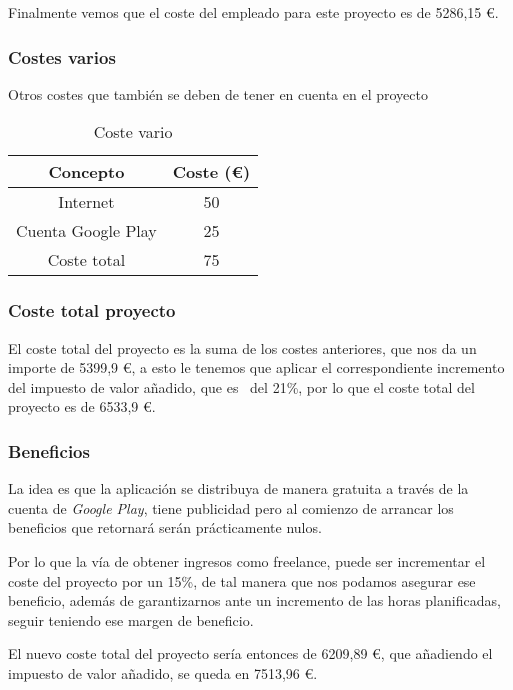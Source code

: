 Finalmente vemos que el coste del empleado para este proyecto es de 5286,15 €.

\subsubsection{Costes varios}
Otros costes que también se deben de tener en cuenta en el proyecto

\begin{table}[H]
	\begin{center}
		\begin{tabular}{cc}
			\hline
			Concepto                        & Coste (€)  	\\ \hline
			Internet					    & 50     		\\
			Cuenta Google Play				& 25			\\ \hline
			Coste total            	 		&75			\\ \hline
		\end{tabular}
		\caption{Coste vario}
		\label{table:costevario}
	\end{center}
\end{table}

\subsubsection{Coste total proyecto}
El coste total del proyecto es la suma de los costes anteriores, que nos da un importe de 5399,9 €, a esto le tenemos que aplicar el correspondiente incremento del impuesto de valor añadido, que es~\cite{noauthor_freelancercom_2020} del 21\%, por lo que el coste total del proyecto es de 6533,9 €.

\subsubsection{Beneficios}
La idea es que la aplicación se distribuya de manera gratuita a través de la cuenta de \emph{Google Play}, tiene publicidad pero al comienzo de arrancar los beneficios que retornará serán prácticamente nulos.

Por lo que la vía de obtener ingresos como freelance, puede ser incrementar el coste del proyecto por un 15\%, de tal manera que nos podamos asegurar ese beneficio, además de garantizarnos ante un incremento de las horas planificadas, seguir teniendo ese margen de beneficio.

El nuevo coste total del proyecto sería entonces de 6209,89 €, que añadiendo el impuesto de valor añadido, se queda en 7513,96 €.

